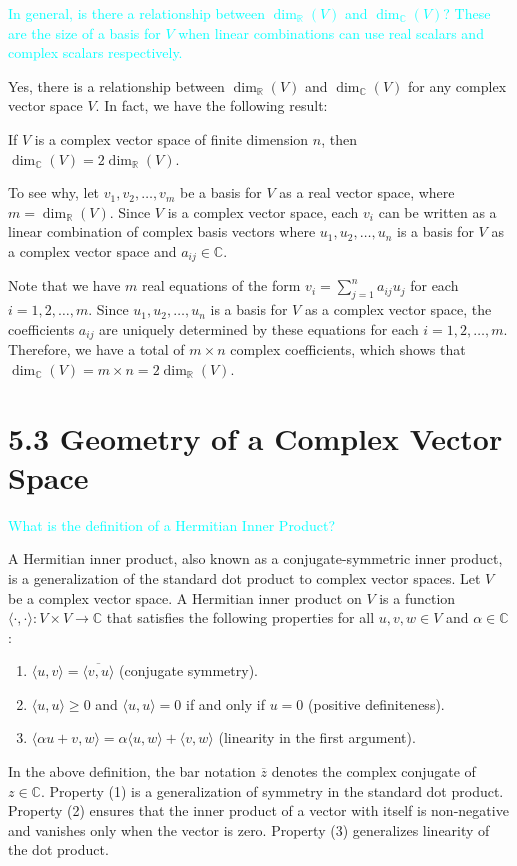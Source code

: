 \documentclass[fontsize=12pt]{scrartcl}
\begin{document}
\noindent
\textcolor{cyan}{In general, is there a relationship between $\dim_{\mathbb{R}}(V)$ and $\dim_{\mathbb{C}}(V)$? These are the size of a basis for $V$ when linear combinations can use real scalars and complex scalars respectively.}

\noindent
Yes, there is a relationship between $\dim_{\mathbb{R}}(V)$ and $\dim_{\mathbb{C}}(V)$ for any complex vector space $V$. In fact, we have the following result:

\noindent
If $V$ is a complex vector space of finite dimension $n$, then $\dim_{\mathbb{C}}(V) = 2\dim_{\mathbb{R}}(V)$.

\noindent
To see why, let ${v_1, v_2, \dots, v_m}$ be a basis for $V$ as a real vector space, where $m=\dim_{\mathbb{R}}(V)$. Since $V$ is a complex vector space, each $v_i$ can be written as a linear combination of complex basis vectors where $u_1, u_2, \dots, u_n$ is a basis for $V$ as a complex vector space and $a_{ij}\in\mathbb{C}$.

\noindent
Note that we have $m$ real equations of the form $v_i=\sum_{j=1}^na_{ij}u_j$ for each $i=1,2,\dots,m$. Since $u_1,u_2,\dots,u_n$ is a basis for $V$ as a complex vector space, the coefficients $a_{ij}$ are uniquely determined by these equations for each $i=1,2,\dots,m$. Therefore, we have a total of $m\times n$ complex coefficients, which shows that $\dim_{\mathbb{C}}(V) = m\times n = 2\dim_{\mathbb{R}}(V)$.


\newpage

\section{5.3 Geometry of a Complex Vector Space}

\bigskip

\noindent
\textcolor{cyan}{What is the definition of a Hermitian Inner Product?}

\noindent
A Hermitian inner product, also known as a conjugate-symmetric inner product, is a generalization of the standard dot product to complex vector spaces. Let $V$ be a complex vector space. A Hermitian inner product on $V$ is a function $\langle\cdot,\cdot\rangle:V\times V\rightarrow\mathbb{C}$ that satisfies the following properties for all $u,v,w\in V$ and $\alpha\in\mathbb{C}$:

\begin{enumerate}
	\item $\langle u,v\rangle=\overline{\langle v,u\rangle}$ (conjugate symmetry).
	\item $\langle u,u\rangle\geq 0$ and $\langle u,u\rangle=0$ if and only if $u=0$ (positive definiteness).
	\item $\langle \alpha u+v,w\rangle=\alpha\langle u,w\rangle+\langle v,w\rangle$ (linearity in the first argument).
\end{enumerate}
In the above definition, the bar notation $\overline{z}$ denotes the complex conjugate of $z\in\mathbb{C}$. Property (1) is a generalization of symmetry in the standard dot product. Property (2) ensures that the inner product of a vector with itself is non-negative and vanishes only when the vector is zero. Property (3) generalizes linearity of the dot product.
\end{document}
